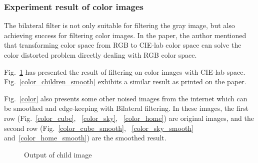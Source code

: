 \documentclass[12pt]{article}
\begin{document}
\subsubsection{Experiment result of color images}
\label{subsubsection color images}
The bilateral filter is not only suitable for filtering the gray image, but also achieving success for filtering color images.
In the paper, the author mentioned that transforming color space from RGB to CIE-lab color space can solve the color distorted problem directly dealing with RGB color space.

Fig.~\ref{color_child} has presented the result of filtering on color images with CIE-lab space.
Fig.~\ref{color_children_smooth} exhibits a similar result as printed on the paper.

Fig.~\ref{color} also presents some other noised images from the internet which can be smoothed and edge-keeping with Bilateral filtering.
In these images, the first row (Fig.~\ref{color_cube}, ~\ref{color_sky}, ~\ref{color_home}) are original images, and the second row (Fig.~\ref{color_cube_smooth}, ~\ref{color_sky_smooth} and~\ref{color_home_smooth}) are the smoothed result.

\begin{figure}[H]
  \centering
  \quad
  \caption{Output of child image}
  \label{color_child}
\end{figure}
\end{document}
